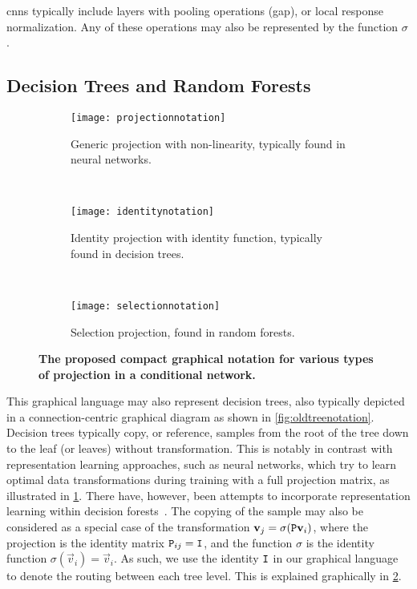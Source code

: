 \documentclass[thesis]{subfiles}
\begin{document}
	\Glspl{cnn} typically include layers with pooling operations (\eg \gls{gap}), or local response normalization. Any of these operations may also be represented by the function $\sigma$.
	
	\subsection{Decision Trees and Random Forests}
	
	\begin{figure}[tbp] 
		\centering
		\begin{subfigure}[b]{\textwidth}
			\centering
			\texttt{[image: projectionnotation]}
			\caption{Generic projection with non-linearity, typically found in neural networks.}\label{fig:projectionnotation}
		\end{subfigure}
		~
		\begin{subfigure}[b]{\textwidth}
			\centering
			\texttt{[image: identitynotation]}
			\caption{Identity projection with identity function, typically found in decision trees.}\label{fig:identitynotation}
		\end{subfigure}
		~
		\begin{subfigure}[b]{\textwidth}
			\centering
			\texttt{[image: selectionnotation]}
			\caption{Selection projection, found in random forests.}\label{fig:selectionnotation}
		\end{subfigure}
		\caption[Various projection matrices in conditional networks.]{\textbf{The proposed compact graphical notation for various types of projection in a conditional network.}}\label{fig:projections}
	\end{figure}
	
	This graphical language may also represent decision trees, also typically depicted in a connection-centric graphical diagram as shown in \cref{fig:oldtreenotation}. Decision trees typically copy, or reference, samples from the root of the tree down to the leaf (or leaves) without transformation. This is notably in contrast with representation learning approaches, such as neural networks, which try to learn optimal data transformations during training with a full projection matrix, as illustrated in \cref{fig:projectionnotation}. There have, however, been attempts to incorporate representation learning within decision forests~\citep{montillo2011entangled,BuloKontsch2014}. The copying of the sample may also be considered as a special case of the transformation $\vec v_j = \sigma(\mat P \vec v_i)$, where the projection is the identity matrix $\mat P_{ij} = \mat I$, and the function $\sigma$ is the identity function $\sigma(\vec v_i) = \vec v_i$. As such, we use the identity $\mat I$ in our graphical language to denote the routing between each tree level. This is explained graphically in \cref{fig:identitynotation}.
	
\end{document}
